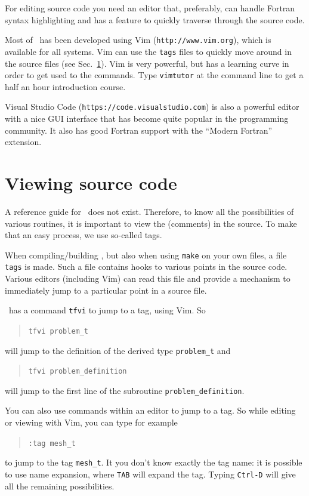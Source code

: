 For editing source code you need an editor that, preferably, can
handle Fortran syntax highlighting and has a feature to quickly traverse through the source code.

Most of \tfem\ has been developed using Vim
(\texttt{http://www.vim.org}), which is available for all systems. 
Vim can use the \texttt{tags} files to quickly move around in the source files (see Sec.~\ref{sec:viewing}). Vim is very powerful, but has a learning curve in order to get used to the commands. 
Type \texttt{vimtutor} at the command line to get a half an hour introduction course. 

Visual Studio Code (\texttt{https://code.visualstudio.com}) is also a powerful editor with a nice GUI interface that has become quite popular in the programming community. It also has good Fortran support with the ``Modern Fortran'' extension.

\section{Viewing source code}
\label{sec:viewing}

A reference guide for \tfem\ does not exist.
Therefore, to know all the
possibilities of various routines, it is important to view the (comments) in
the source. To make that an easy process, we use so-called tags.

When compiling/building \tfem,
but also when using \texttt{make} on your own files,
a file \texttt{tags} is made. Such a file contains hooks to various points in
the source code. Various editors (including Vim)
can read this file and provide a 
mechanism to immediately jump to a particular point in a source file.

\tfem\ has a command \texttt{tfvi} to jump to a tag, using Vim. So
\begin{quote}
   \texttt{tfvi problem\_t}
\end{quote}
will jump to the definition of the derived type \texttt{problem\_t} and 
\begin{quote}
   \texttt{tfvi problem\_definition}
\end{quote}
will jump to the first line of the subroutine \texttt{problem\_definition}.

You
can also use commands within an editor to jump to a tag. So while editing
or viewing with Vim, you can type for example
\begin{quote}
   \texttt{:tag mesh\_t}
\end{quote}
to jump to the tag \texttt{mesh\_t}. It you don't know exactly the tag name:
it is possible to use name expansion, where \texttt{TAB} will expand the tag.
Typing \texttt{Ctrl-D} will give all the remaining possibilities.


